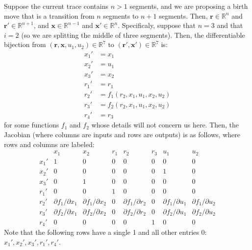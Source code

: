 \documentclass{article}
\begin{document}
Suppose the current trace contains $n > 1$ segments, and we are proposing a birth move that is a transition from $n$ segments to $n+1$ segments.
Then, $\mathbf{r} \in \mathbb{R}^n$ and $\mathbf{r}' \in \mathbb{R}^{n+1}$, and $\mathbf{x} \in \mathbb{R}^{n-1}$ and $\mathbf{x'} \in \mathbb{R}^n$.
Specificaly, suppose that $n = 3$ and that $i = 2$ (so we are splitting the middle of three segments).
Then, the differentiable bijection from $(\mathbf{r}, \mathbf{x}, u_1, u_2) \in \mathbb{R}^{7}$ to $(\mathbf{r}', \mathbf{x}') \in \mathbb{R}^{7}$ is:
\[
\begin{array}{rl}
x_1' &= x_1 \\
x_2' &= u_1 \\
x_3' &= x_2 \\
r_1' &= r_1 \\
r_2' &= f_1(r_2, x_1, u_1, x_2, u_2) \\
r_3' &= f_2(r_2, x_1, u_1, x_2, u_2)\\
r_4' &= r_3
\end{array}
\]
for some functions $f_1$ and $f_2$ whose details will not concern us here.
Then, the Jacobian (where columns are inputs and rows are outputs) is as follows, where rows and columns are labeled:
\[
\begin{array}{c|ccccccc}
&       x_1 & x_2 & r_1 &   r_2 &   r_3 &   u_1 &   u_2 \\
\hline
x_1'  & 1   & 0   & 0   &   0   &   0   &   0   &   0   \\
x_2'  & 0   & 0   & 0   &   0   &   0   &   1   &   0   \\
x_3'  & 0   & 1   & 0   &   0   &   0   &   0   &   0   \\
r_1'  & 0   & 0   & 1   &   0   &   0   &   0   &   0   \\
r_2'  & {\scriptstyle \partial f_1 / \partial x_1}
      & {\scriptstyle \partial f_1 / \partial x_2}
      & 0
      & {\scriptstyle \partial f_1 / \partial r_2}
      & 0
      & {\scriptstyle \partial f_1 / \partial u_1}
      & {\scriptstyle \partial f_1 / \partial u_2}   \\
r_3'  & {\scriptstyle \partial f_2 / \partial x_1}
      & {\scriptstyle \partial f_2 / \partial x_2}
      & 0
      & {\scriptstyle \partial f_2 / \partial r_2}
      & 0
      & {\scriptstyle \partial f_2 / \partial u_1}
      & {\scriptstyle \partial f_2 / \partial u_2}   \\
r_4'  & 0   & 0   & 0   &   0   &   1   &   0   &   0
\end{array}
\]
Note that the following rows have a single 1 and all other entries 0: $x_1', x_2', x_3', r_1', r_4'$.
\end{document}
